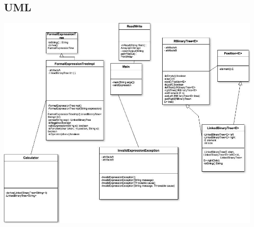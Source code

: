 \documentclass[a4paper]{article}
\begin{document}
\subsection*{UML}

\includegraphics[scale=0.5]{uml}
\end{document}
